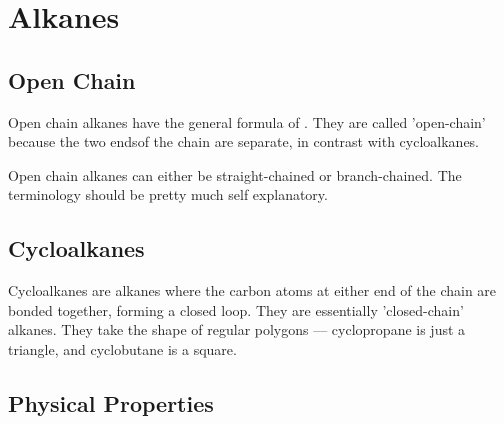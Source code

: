 

\pagebreak
\section{Alkanes}

\subsection{Open Chain}

	Open chain alkanes have the general formula of . They are called 'open-chain' because
	the two endsof the chain are separate, in contrast with cycloalkanes.

	Open chain alkanes can either be straight-chained or branch-chained. The terminology should be pretty much
	self explanatory.





\subsection{Cycloalkanes}

	Cycloalkanes are alkanes where the carbon atoms at either end of the chain are bonded together, forming a closed loop.
	They are essentially 'closed-chain' alkanes. They take the shape of regular polygons –– cyclopropane is just a triangle,
	and cyclobutane is a square.




\pagebreak
\subsection{Physical Properties}

